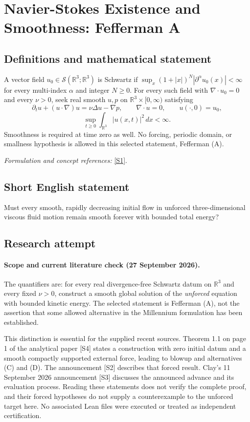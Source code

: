 \documentclass[11pt]{article}
\begin{document}
\section*{\texorpdfstring{Navier-Stokes Existence and Smoothness: Fefferman A}{Navier-Stokes Existence and Smoothness: Fefferman A}}\label{statement}
\subsection{Definitions and mathematical statement}
A vector field $u_0\in\mathcal S({\mathbb{R}}^3;{\mathbb{R}}^3)$ is Schwartz if $\sup_x(1+|x|)^N|\partial^\alpha u_0(x)|<\infty$ for every multi-index $\alpha$ and integer $N\ge0$. For every such field with $\nabla\cdot u_0=0$ and every $\nu>0$, seek real smooth $u,p$ on ${\mathbb{R}}^3\times[0,\infty)$ satisfying
\[
 \partial_tu+(u\cdot\nabla)u=\nu\Delta u-\nabla p,\qquad
 \nabla\cdot u=0,\qquad u(\cdot,0)=u_0,
\]
\[
 \sup_{t\ge0}\int_{{\mathbb{R}}^3}|u(x,t)|^2\,dx<\infty.
\]
Smoothness is required at time zero as well. No forcing, periodic domain, or smallness hypothesis is allowed in this selected statement, Fefferman (A).
\par\smallskip\textit{Formulation and concept references:} \href{https://www.claymath.org/wp-content/uploads/2022/06/navierstokes.pdf}{[S1]}.

\subsection{Short English statement}
Must every smooth, rapidly decreasing initial flow in unforced three-dimensional viscous fluid motion remain smooth forever with bounded total energy?
\subsection{Research attempt}

\paragraph{Scope and current literature check (27 September 2026).}
The quantifiers are: for every real divergence-free Schwartz datum on
 $\mathbb R^3$ and every fixed $\nu>0$, construct a smooth global solution
 of the \emph{unforced} equation with bounded kinetic energy. The selected
 statement is Fefferman (A), not the assertion that some allowed alternative
 in the Millennium formulation has been established.

This distinction is essential for the supplied recent sources. Theorem 1.1
 on page 1 of the analytical paper [S4] states a construction with zero
 initial datum and a smooth compactly supported external force, leading to
 blowup and alternatives (C) and (D). The announcement [S2] describes that
 forced result. Clay's 11 September 2026 announcement [S3] discusses the
 announced advance and its evaluation process. Reading these statements
 does not verify the complete proof, and their forced hypotheses do not
 supply a counterexample to the unforced target here. No associated Lean
 files were executed or treated as independent certification.
\end{document}
